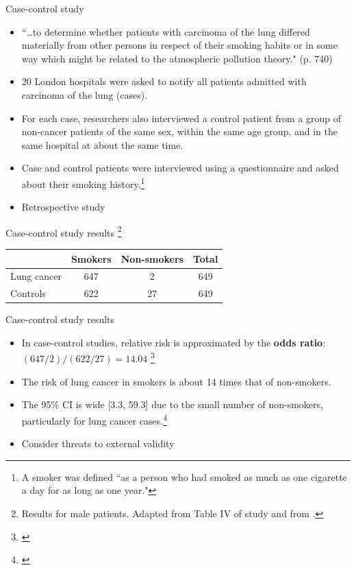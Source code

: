 \documentclass{beamer}
\begin{document}
\begin{frame}{Case-control study \citep{Doll1950}}
	\begin{itemize}
	\item ``\dots to determine whether patients with carcinoma of the lung differed materially from other persons in respect of their smoking habits or in some way which might be related to the atmospheric pollution theory." (p. 740)
	\item 20 London hospitals were asked to notify all patients admitted with carcinoma of the lung \alert{(cases)}.
	\item For each case, researchers also interviewed a \alert{control} patient from a group of non-cancer patients of the same sex, within the same age group, and in the same hospital at about the same time. 
	\item Case and control patients were interviewed using a questionnaire and asked about their smoking history.\footnote{\tiny{A smoker was defined ``as a person who had smoked as much as one cigarette a day for as long as one year."}}
	\item Retrospective study
	\end{itemize}
\end{frame}

\begin{frame}{Case-control study results \citep{Doll1950}\footnote{\tiny{Results for male patients. Adapted from Table IV of study and from \citet[p. 242]{Bland2000}.}}}
	\begin{table}
	\centering
	\begin{tabular}{ l c c c }
	\toprule
	& Smokers & Non-smokers & Total\\
	\midrule
	Lung cancer & 647 & 2 & 649 \\
	Controls & 622 & 27 & 649 \\
	\bottomrule
	\end{tabular} 
	\end{table}
\end{frame}

\begin{frame}{Case-control study results \citep{Doll1950}}
	\begin{itemize}
	\item In case-control studies, relative risk is approximated by the \textbf{odds ratio}: $(647 / 2) / (622 / 27)= 14.04$ \footnote{\tiny{\citet[p. 242]{Bland2000}}} 
	\item The risk of lung cancer in smokers is about \alert{14 times} that of non-smokers.  
	\item The 95\% CI is wide \alert{[3.3, 59.3]} due to the small number of non-smokers, particularly for lung cancer cases.\footnote{\tiny{\citet[p. 243]{Bland2000}}}
	\item Consider threats to external validity
	\end{itemize}
\end{frame}
\end{document}
